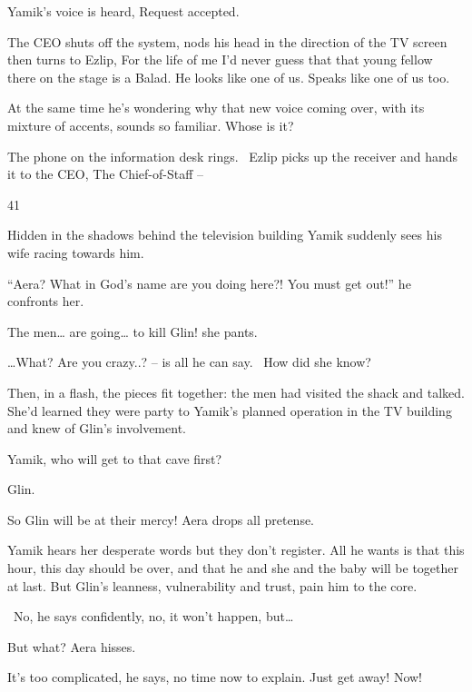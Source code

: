 \documentclass[letterpaper]{article}
\begin{document}
Yamik's voice is heard, {\textquotedbl}Request accepted.{\textquotedbl}

The CEO shuts off the system, nods his head in the direction of the TV screen then turns
to{ }Ezlip, {\textquotedbl}For the life of me I'd never guess that that young
fellow there on the stage is a Balad. He looks like one of us. Speaks like one of us too.{\textquotedbl}

At the same time he's wondering why that new voice coming over,{ }with its
mixture of accents, sounds so familiar. Whose{ }is it?

The phone on the information desk rings. \ Ezlip picks up the receiver and hands it to the CEO, {\textquotedbl}The
Chief-of-Staff --{\textquotedbl}


\bigskip

41 

Hidden in the shadows behind the television building Yamik suddenly sees his wife racing towards him. 

{}``Aera? What in God's name are you doing here?! You must get out!'' he confronts her. 

{\textquotedbl}The men{\dots} are going{\dots} to kill Glin!{\textquotedbl} she pants.

{{\dots}}{\textquotedbl}What?{ }Are you
crazy..?{\textquotedbl} -- is all he can say. \ How did she know? 

Then, in a flash, the pieces fit together: the men had visited the shack and talked. She'd learned they were party to
Yamik's planned operation in the TV building and knew of Glin's involvement.

{\textquotedbl}Yamik, who will get to that cave first?{\textquotedbl} 

{\textquotedbl}Glin.{\textquotedbl} 

{\textquotedbl}So Glin will be at their mercy!{\textquotedbl} Aera drops all pretense. 

Yamik hears her desperate words but they don't register. All he wants is that this hour, this day should be over, and
that he and she and the baby will be together at last. But Glin's leanness, vulnerability and trust, pain him to the
core{.}

\ {\textquotedbl}No,{\textquotedbl} he says{ }confidently,
{\textquotedbl}no,{ }it won't happen, but{\dots}{\textquotedbl} 

{\textquotedbl}But what?{\textquotedbl} Aera hisses. 

{\textquotedbl}It's too complicated,{\textquotedbl} he says, {\textquotedbl}no time now to explain. Just get away!
Now!{\textquotedbl} 
\end{document}
